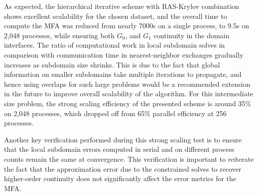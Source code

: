 As expected, the hierarchical iterative scheme with RAS-Krylov combination shows excellent scalability for the chosen dataset, and the overall time to compute the MFA was reduced from nearly 7000s on a single process, to 9.5s on 2,048 processes, while ensuring both $G_0$, and $G_1$ continuity in the domain interfaces. The ratio of computational work in local subdomain solves in comparison with communication time in nearest-neighbor exchanges gradually increases as subdomain size shrinks. This is due to the fact that global information on smaller subdomains take multiple iterations to propagate, and hence using overlaps for such large problems would be a recommended extension in the future to improve overall scalability of the algorithm. For this intermediate size problem, the strong scaling efficiency of the presented scheme is around 35\% on 2,048 processes, which dropped off from 65\% parallel efficiency at 256 processes.

Another key verification performed during this strong scaling test is to ensure that the local subdomain errors computed in serial and on different process counts remain the same at convergence. This verification is important to reiterate the fact that the approximation error due to the constrained solves to recover higher-order continuity does not significantly affect the error metrics for the MFA.




